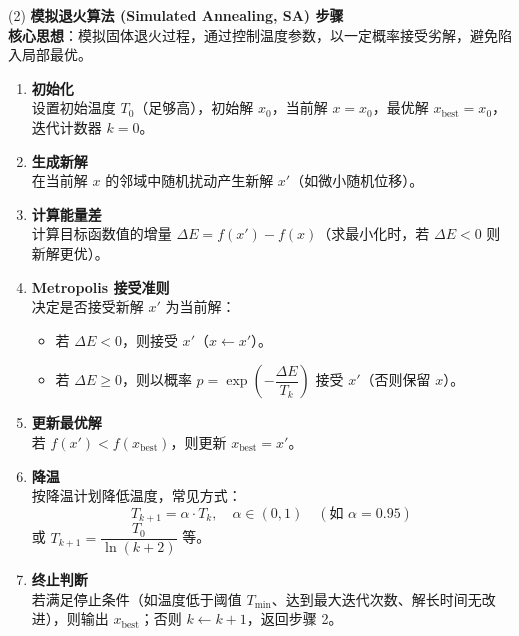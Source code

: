 \documentclass[UTF8]{article}
\begin{document}
(2) \textbf{模拟退火算法 (Simulated Annealing, SA) 步骤} \\
\textbf{核心思想}：模拟固体退火过程，通过控制温度参数，以一定概率接受劣解，避免陷入局部最优。\\

\begin{enumerate}[label=\textbf{步骤 \arabic*：}, leftmargin=2em, align=left]
    \item \textbf{初始化} \\
    设置初始温度 $T_0$（足够高），初始解 $x_0$，当前解 $x = x_0$，最优解 $x_{\text{best}} = x_0$，迭代计数器 $k=0$。
    
    \item \textbf{生成新解} \\
    在当前解 $x$ 的邻域中随机扰动产生新解 $x'$（如微小随机位移）。
    
    \item \textbf{计算能量差} \\
    计算目标函数值的增量 $\Delta E = f(x') - f(x)$（求最小化时，若 $\Delta E < 0$ 则新解更优）。
    
    \item \textbf{Metropolis 接受准则} \\
    决定是否接受新解 $x'$ 为当前解：
    \begin{itemize}
        \item 若 $\Delta E < 0$，则接受 $x'$（$x \leftarrow x'$）。
        \item 若 $\Delta E \geq 0$，则以概率 $p = \exp\left(-\dfrac{\Delta E}{T_k}\right)$ 接受 $x'$（否则保留 $x$）。
    \end{itemize}
    
    \item \textbf{更新最优解} \\
    若 $f(x') < f(x_{\text{best}})$，则更新 $x_{\text{best}} = x'$。
    
    \item \textbf{降温} \\
    按降温计划降低温度，常见方式：
    \begin{equation}
        T_{k+1} = \alpha \cdot T_k, \quad \alpha \in (0,1) \quad (\text{如 } \alpha=0.95)
    \end{equation}
    或 $T_{k+1} = \dfrac{T_0}{\ln(k+2)}$ 等。
    
    \item \textbf{终止判断} \\
    若满足停止条件（如温度低于阈值 $T_{\min}$、达到最大迭代次数、解长时间无改进），则输出 $x_{\text{best}}$；否则 $k \leftarrow k+1$，返回步骤 2。
\end{enumerate}
\end{document}
